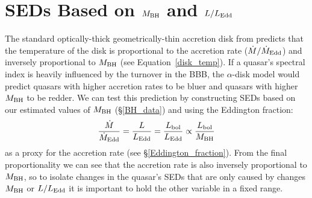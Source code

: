
\section{SEDs Based on $M_{\rm BH}$ and $L/L_{\rm Edd}$} \label{mbh_seds}

The standard optically-thick geometrically-thin accretion disk from \citet[][see \S\ref{sec:AD} for a review of the $\alpha$-disk model]{Shakura:1973} predicts that the temperature of the disk is proportional to the accretion rate ($\dot{M}/\dot{M}_{\rm Edd}$) and inversely proportional to $M_{\rm BH}$ (see Equation~\ref{disk_temp}). If a quasar's spectral index is heavily influenced by the turnover in the BBB, the $\alpha$-disk model would predict quasars with higher accretion rates to be bluer and quasars with higher $M_{\rm BH}$ to be redder.  We can test this prediction by constructing SEDs based on our estimated values of $M_{\rm BH}$ (\S\ref{BH_data}) and using the Eddington fraction:
\begin{equation} \label{lf_eqn}
	\frac{\dot{M}}{\dot{M}_{\rm Edd}} = \frac{L}{L_{\rm Edd}} = \frac{L_{\rm bol}}{L_{\rm Edd}} \propto \frac{L_{\rm bol}}{M_{\rm BH}}
\end{equation}
as a proxy for the accretion rate (see \S\ref{Eddington_fraction}). From the final proportionality we can see that the accretion rate is also inversely proportional to $M_{\rm BH}$, so to isolate changes in the quasar's SEDs that are only caused by changes $M_{\rm BH}$ or $L/L_{\rm Edd}$ it is important to hold the other variable in a fixed range.  

